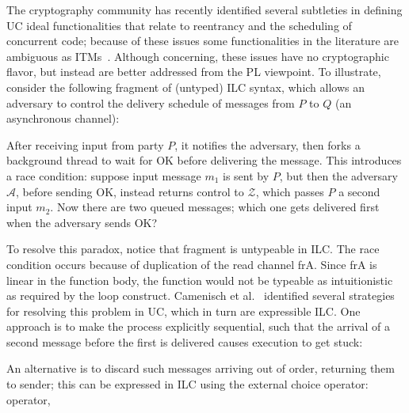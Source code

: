 The cryptography community has recently identified several subtleties in defining UC ideal functionalities that relate to reentrancy and the scheduling of concurrent code;
because of these issues some functionalities in the literature are ambiguous as ITMs~\cite{camenisch2016universal}.
Although concerning, these issues have no cryptographic flavor, but instead are better addressed from the PL viewpoint.
To illustrate, consider the following fragment of (untyped) ILC syntax, which allows an adversary to control the delivery schedule of messages from $P$ to $Q$ (an asynchronous channel):

After receiving input from party $P$, it
notifies the adversary, then forks a background thread to wait for \textsf{OK} before
delivering the message.
This introduces a race condition: suppose input message $m_1$ is sent by $P$, but then the adversary $\mathcal A$, before sending \textsf{OK}, instead returns control to $\mathcal Z$, which passes $P$ a second input $m_2$. Now there are two queued messages; which one gets delivered first when the adversary sends \textsf{OK}?

To resolve this paradox, notice that fragment is untypeable in ILC.
The race condition occurs because of duplication of the read channel \textsf{frA}.
Since \textsf{frA} is linear in the function body, the function would not be typeable as intuitionistic as required by the \textsf{loop} construct.
Camenisch et al.~\cite{camenisch2016universal} identified several strategies for resolving this problem in UC, which in turn are expressible ILC. One approach is to make the process explicitly sequential, such that the arrival of a second message before the first is delivered causes execution to get stuck:

An alternative is to discard such messages arriving out of order, returning them to sender; this can be expressed in ILC using the external choice operator:
operator,

